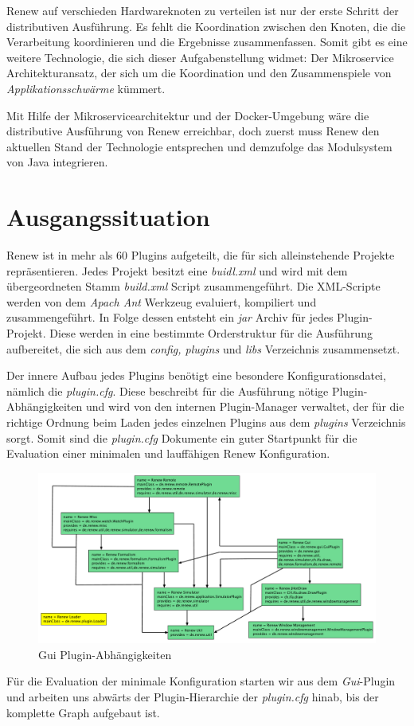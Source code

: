 Renew auf verschieden Hardwareknoten zu verteilen ist nur der erste Schritt der distributiven Ausführung. Es fehlt die Koordination zwischen den Knoten, die die Verarbeitung koordinieren und die Ergebnisse zusammenfassen. Somit gibt es eine weitere Technologie, die sich dieser Aufgabenstellung widmet: Der Mikroservice Architekturansatz, der sich um die Koordination und den Zusammenspiele von \textit{Applikationsschwärme} kümmert. \bigbreak

Mit Hilfe der Mikroservicearchitektur und der Docker-Umgebung wäre die distributive Ausführung von Renew erreichbar, doch zuerst muss Renew den aktuellen Stand der Technologie entsprechen und demzufolge das Modulsystem von Java integrieren.  


\section{Ausgangssituation} \label{sec:ausgangssituation} 

Renew ist in mehr als 60 Plugins aufgeteilt, die für sich alleinstehende Projekte repräsentieren. Jedes Projekt besitzt eine \textit{buidl.xml} und wird mit dem übergeordneten Stamm \textit{build.xml} Script zusammengeführt. Die XML-Scripte werden von dem \textit{Apach Ant} Werkzeug evaluiert, kompiliert und zusammengeführt. In Folge dessen entsteht ein \textit{jar} Archiv für jedes Plugin-Projekt. Diese werden in eine bestimmte Orderstruktur für die Ausführung aufbereitet, die sich aus dem \textit{config, plugins} und \textit{libs} Verzeichnis zusammensetzt. 
\bigbreak

Der innere Aufbau jedes Plugins benötigt eine besondere Konfigurationsdatei, nämlich die \textit{plugin.cfg}. Diese beschreibt für die Ausführung nötige Plugin-Abhängigkeiten und wird von den internen Plugin-Manager verwaltet, der für die richtige Ordnung beim Laden jedes einzelnen Plugins aus dem \textit{plugins} Verzeichnis sorgt. Somit sind die \textit{plugin.cfg} Dokumente ein guter Startpunkt für die Evaluation einer minimalen und lauffähigen Renew Konfiguration. 
\bigbreak
\begin{figure}[h!]
  \centering
  \includegraphics[width=\textwidth]{material/images/renew_plugin_dependencies2.pdf}
  \caption{Gui Plugin-Abhängigkeiten}
  \label{fig:plugin_deps}
\end{figure}
Für die Evaluation der minimale Konfiguration starten wir aus dem \textit{Gui}-Plugin und arbeiten uns abwärts der Plugin-Hierarchie der \textit{plugin.cfg} hinab, bis der komplette Graph aufgebaut ist.


